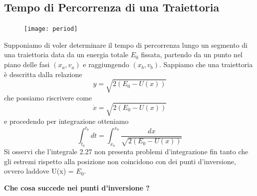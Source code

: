 \subsection{Tempo di Percorrenza di una Traiettoria}
\begin{figure}
\vspace{-0.3in}
  \begin{center}
    \texttt{[image: period]}
  \end{center}
\end{figure}

Supponiamo di voler determinare il tempo di percorrenza lungo un segmento di una traiettoria data da un energia totale $E_0$ fissata, partendo da un punto nel piano delle fasi $(x_a,v_a)$ e raggiungendo $(x_b,v_b)$. Sappiamo che una traiettoria \`{e} descritta dalla relazione 
\begin{equation*}
	y = \sqrt{2(E_0 - U(x))}
\end{equation*}
che possiamo riscrivere come 
\begin{equation*}
	\dot{x} = \sqrt{2(E_0 - U(x))}
\end{equation*}
\newpage
e procedendo per integrazione otteniamo
\begin{equation}
 \int_{t_a}^{t_b}dt = \int_{x_a}^{x_b} \frac{dx}{\sqrt{2(E_0 -U(x))}}
\end{equation}
Si osservi che l'integrale 2.27 non presenta problemi d'integrazione fin tanto che gli estremi rispetto alla posizione non coincidono con dei punti d'inversione, ovvero laddove U(x) = $E_0$.
\newline

\noindent \textbf{Che cosa succede nei punti d'inversione ?}
\newline

